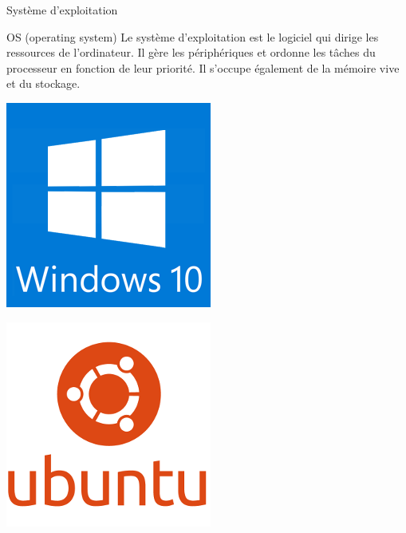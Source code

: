 \begin{frame}{Système d'exploitation}

  \begin{block}{OS (operating system)}
    Le système d'exploitation est le logiciel qui dirige les ressources de l'ordinateur. Il gère les périphériques et ordonne les tâches du processeur en fonction de leur priorité. Il s'occupe également de la mémoire vive et du stockage.
  \end{block}
  \vfill
  \begin{minipage}{0.25\linewidth}
	  \includegraphics[width=\linewidth]{images/logo_windows10.jpg}
  \end{minipage}
  \hfill
  \begin{minipage}{0.25\linewidth}
	  \includegraphics[width=\linewidth]{images/logo_ubuntu.png}

\end{minipage}
\end{frame}
